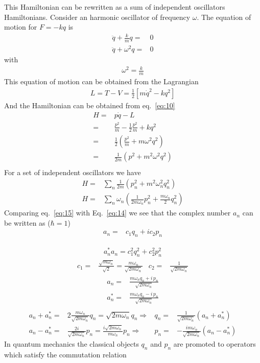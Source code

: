 This Hamiltonian can be rewritten as a sum of independent  oscillators Hamiltonians. Consider an harmonic oscillator of frequency $\omega$. The equation of motion for $F=-k q$ is
\begin{align}
  \ddot{q}+\frac{k}{m}q=&0\nonumber\\
   \ddot{q}+\omega^2q=&0
\end{align}
with
\begin{align}
  \omega^2=\frac{k}{m}
\end{align}
This equation of motion can be obtained from the Lagrangian
\begin{align}
  L=T-V=\frac{1}{2}[m\dot{q}^2-k q^2]
\end{align}
And the Hamiltonian can be obtained from eq.~\eqref{eq:10}
\begin{align}
   H=&p \dot{q}-L\nonumber\\
   =&\frac{p^2}{m}-\frac{1}{2}\frac{p^2}{m}+k q^2\nonumber\\
   =&\frac{1}{2}\left(\frac{p^2}{m}+m \omega^2 q^2\right)\nonumber\\
   =&\frac{1}{2m}\left({p^2}+m^2 \omega^2 q^2\right)\nonumber\\
\end{align}
For a set of independent oscillators we have
\begin{align}
\label{eq:15}
  H=&\sum_n\frac{1}{2m}\left({p_n^2}+m^2 \omega_n^2 q_n^2\right)\nonumber\\
  H=&\sum_n{\omega_n}\left(\frac{1}{{2m}\omega_n}p_n^2+\frac{m\omega_n}{2} q_n^2\right)
\end{align}
Comparing eq.~\eqref{eq:15} with Eq.~\eqref{eq:14} we see that the complex number $a_n$ can be written as ($\hbar=1$)
\begin{align}
  a_n=& c_1q_n+i c_2p_n
\end{align}

\begin{align}
  a_n^*a_n=c_1^2 q_n^2+c_2^2 p_n^2
\end{align}
\begin{align}
c_1=&\frac{\sqrt{m\omega_n}}{\sqrt{2}}=\frac{m\omega_n}{\sqrt{2m\omega_n}}   & c_2=&\frac{1}{\sqrt{2m\omega_n}}
\end{align}
\begin{align}
  a_n=&\frac{m\omega_n q_n+i\,p_n}{\sqrt{2m\omega_n}}\nonumber\\
  a_n^*=&\frac{m\omega_n q_n-i\,p_n}{\sqrt{2m\omega_n}}\nonumber\\
\end{align}
\begin{align}
a_n+a_n^*=& 2\frac{m\omega_n}{\sqrt{2m\omega_n}}q_n=\sqrt{2m\omega_n}q_n \Rightarrow& q_n=&\frac{1}{\sqrt{2m\omega_n}}(a_n+a_n^*) \nonumber\\
a_n-a_n^*=&\frac{2i}{\sqrt{2m\omega_n}}p_n=\frac{i\sqrt{2m\omega_n}}{m\omega_n}p_n
\Rightarrow& p_n=&-\frac{im\omega_n}{\sqrt{2m\omega_n}}(a_n-a_n^*) 
\end{align}
In quantum mechanics the classical objects $q_n$ and $p_n$ are promoted to operators which satisfy the commutation relation

